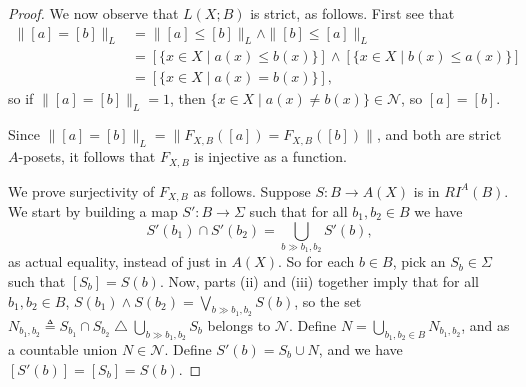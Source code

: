 \documentclass{lmcs}
\newcommand{\En}{\mathcal{N}}
\newcommand{\defeq}{\mathrel{\triangleq}}
\newcommand{\bvs}[1]{\| {#1} \|}
\newcommand{\symdiff}{\mathbin{\triangle}}
\begin{document}
\begin{proof}
We now observe that $L(X;B)$ is strict, as follows. First see that
\begin{align*}
\bvs{[a] = [b]}_L &= \bvs{[a] \leq [b]}_L \land \bvs{[b] \leq [a]}_L \\
 &= [\{ x \in X \mid a(x) \leq b(x) \}] \land [\{ x \in X \mid b(x) \leq a(x) \}] \\
 &= [\{ x \in X \mid a(x) = b(x) \}],
\end{align*}
so if $\bvs{[a] = [b]}_L = 1$, then $\{ x \in X \mid a(x) \neq b(x) \} \in \En$, so $[a] = [b]$. 

Since $\bvs{[a] = [b]}_L = \bvs{F_{X,B}([a]) = F_{X,B}([b])}$, and both are strict $A$-posets, it follows that $F_{X,B}$ is injective as a function. 

We prove surjectivity of $F_{X,B}$ as follows. Suppose $S : B \rightarrow A(X)$ is in $RI^A(B)$. We start by building a map $S' : B \rightarrow \Sigma$ such that for all $b_1,b_2 \in B$ we have
\begin{equation}
\label{SPrimeEqn}
S'(b_1) \cap S'(b_2) = \bigcup_{b \gg b_1,b_2} S'(b),
\end{equation}
as actual equality, instead of just in $A(X)$. So for each $b \in B$, pick an $S_b \in \Sigma$ such that $[S_b] = S(b)$. Now, parts (ii) and (iii) together imply that for all $b_1,b_2 \in B$, $S(b_1) \land S(b_2) = \bigvee_{b \gg b_1,b_2} S(b)$, so the set $N_{b_1,b_2} \defeq S_{b_1} \cap S_{b_2} \symdiff \bigcup_{b \gg b_1,b_2} S_b$ belongs to $\En$. Define $N = \bigcup_{b_1,b_2 \in B} N_{b_1,b_2}$, and as a countable union $N \in \En$. Define $S'(b) = S_b \cup N$, and we have $[S'(b)] = [S_b] = S(b)$. 


\end{proof}
\end{document}
